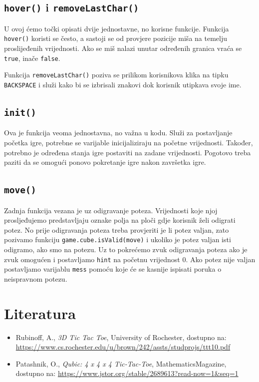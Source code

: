 \documentclass[12pt]{scrartcl}
\begin{document}
\subsection{\texttt{hover()} i \texttt{removeLastChar()}}\label{subsec:hover}
U ovoj ćemo točki opisati dvije jednostavne, no korisne funkcije. Funkcija \texttt{hover()} koristi se često, a sastoji se od provjere pozicije miša na temelju proslijeđenih vrijednosti. Ako se miš nalazi unutar određenih granica vraća se \texttt{true}, inače \texttt{false}.

Funkcija \texttt{removeLastChar()} poziva se prilikom korisnikova klika na tipku \texttt{BACKSPACE} i služi kako bi se izbrisali znakovi dok korisnik utipkava svoje ime. 


\subsection{\texttt{init()}}\label{subsec:init}
Ova je funkcija veoma jednostavna, no važna u kodu. Služi za postavljanje početka igre, potrebne se varijable inicijaliziraju na početne vrijednosti. Također, potrebno je određena stanja igre postaviti na zadane vrijednosti. Pogotovo treba paziti da se omogući ponovo pokretanje igre nakon završetka igre. 
\subsection{\texttt{move()}}\label{subsec:move}
Zadnja funkcija vezana je uz odigravanje poteza. Vrijednosti koje njoj prosljeđujemo predstavljaju oznake polja na ploči gdje korisnik želi odigrati potez. No prije odigravanja poteza treba provjeriti je li potez valjan, zato pozivamo funkciju \texttt{game.cube.isValid(move)} i ukoliko je potez valjan isti odigramo, ako smo na potezu. Uz to pokrećemo zvuk odigravanja poteza ako je zvuk omogućen i postavljamo \texttt{hint} na početnu vrijednost 0. Ako potez nije valjan postavljamo varijablu \texttt{mess} pomoću koje će se kasnije ispisati poruka o neispravnom potezu. 

\newpage
\section*{Literatura}
\begin{itemize}
    \item Rubinoff, A., \emph{3D Tic Tac Toe}, University of Rochester, dostupno na: \url{https://www.cs.rochester.edu/u/brown/242/assts/studprojs/ttt10.pdf}
    \item Patashnik, O., \emph{Qubic: 4 x 4 x 4 Tic-Tac-Toe}, MathematicsMagazine, dostupno na: \url{https://www.jstor.org/stable/2689613?read-now=1&seq=1}

\end{itemize}
\end{document}
